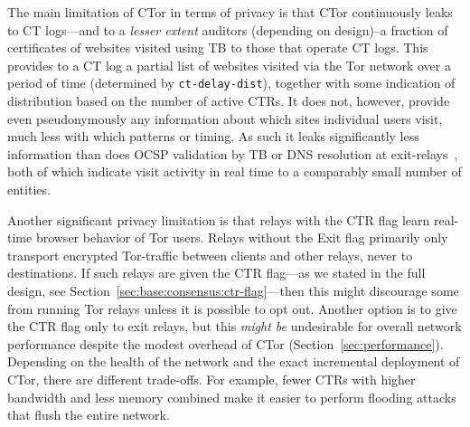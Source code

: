 The main limitation of CTor in terms of privacy is that CTor continuously leaks
to CT logs---and to a \emph{lesser extent} auditors (depending on design)--a
fraction of certificates of websites visited using TB to those that operate CT
logs. This provides to a CT log a partial list of websites visited via the Tor
network over a period of time (determined by \texttt{ct-delay-dist}), together
with some indication of distribution based on the number of active CTRs. It does
not, however, provide even pseudonymously any information about which sites
individual users visit, much less with which patterns or timing. As such it
leaks significantly less information than does OCSP validation by TB or DNS
resolution at exit-relays~\cite{TorDNS}, both of which indicate visit activity
in real time to a comparably small number of entities.

Another significant privacy limitation is that relays with the CTR flag learn
real-time browser behavior of Tor users. Relays without the Exit flag primarily
only transport encrypted Tor-traffic between clients and other relays, never to
destinations. If such relays are given the CTR flag---as we stated in the full
design, see Section~\ref{sec:base:consensus:ctr-flag}---then this might
discourage some from running Tor relays unless it is possible to opt out.
Another option is to give the CTR flag only to exit relays, but this \emph{might
be} undesirable for overall network performance despite the modest overhead of
CTor (Section~\ref{sec:performance}). Depending on the health of the network
and the exact incremental deployment of CTor, there are different trade-offs.
For example, fewer CTRs with higher bandwidth and less memory combined make it
easier to perform flooding attacks that flush the entire network.
